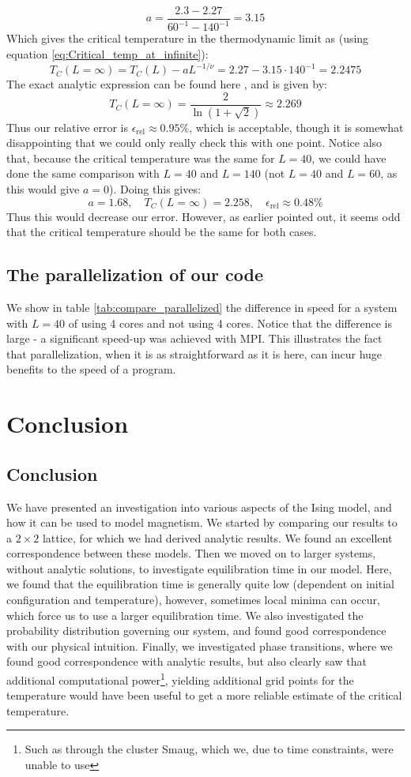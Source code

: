 \documentclass[a4paper, 10pt]{article}
\begin{document}
$$a=\frac{2.3-2.27}{60^{-1}-140^{-1}}=3.15$$
Which gives the critical temperature in the thermodynamic limit as (using equation \ref{eq:Critical_temp_at_infinite}):
$$T_C(L=\infty)=T_C(L)-aL^{-1/\nu}=2.27-3.15\cdot 140^{-1}=2.2475$$
The exact analytic expression can be found here \cite{Project}, and is given by:
$$T_C(L=\infty)=\frac{2}{\ln(1+\sqrt{2})}\approx2.269$$
Thus our relative error is $\epsilon_{\mathrm{rel}}\approx 0.95 \%$, which is acceptable, though it is somewhat disappointing that we could only really check this with one point. Notice also that, because the critical temperature was the same for $L=40$, we could have done the same comparison with $L=40$ and $L=140$ (not $L=40$ and $L=60$, as this would give $a=0$). Doing this gives:
$$a=1.68, \quad T_C(L=\infty)=2.258, \quad \epsilon_{\mathrm{rel}}\approx 0.48 \%$$
Thus this would decrease our error. However, as earlier pointed out, it seems odd that the critical temperature should be the same for both cases.
\subsection{The parallelization of our code}
We show in table \ref{tab:compare_parallelized} the difference in speed for a system with $L=40$ of using 4 cores and not using 4 cores. Notice that the difference is large - a significant speed-up was achieved with MPI. This illustrates the fact that parallelization, when it is as straightforward as it is here, can incur huge benefits to the speed of a program.
\section{Conclusion}
\subsection{Conclusion}
We have presented an investigation into various aspects of the Ising model, and how it can be used to model magnetism. We started by comparing our results to a $2\times 2$ lattice, for which we had derived analytic results. We found an excellent correspondence between these models. Then we moved on to larger systems, without analytic solutions, to investigate equilibration time in our model. Here, we found that the equilibration time is generally quite low (dependent on initial configuration and temperature), however, sometimes local minima can occur, which force us to use a larger equilibration time. We also investigated the probability distribution governing our system, and found good correspondence with our physical intuition. Finally, we investigated phase transitions, where we found good correspondence with analytic results, but also clearly saw that additional computational power\footnote{Such as through the cluster Smaug, which we, due to time constraints, were unable to use}, yielding additional grid points for the temperature would have been useful to get a more reliable estimate of the critical temperature.
\end{document}
